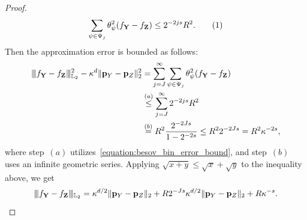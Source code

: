 \documentclass[twoside,11pt]{article}
\newcommand\numberthis{\addtocounter{equation}{1}\tag{\theequation}}
\newcommand{\Ell}{\mathbb{L}}
\newcommand{\EllTwo}{\Ell_2} %
\newcommand{\rvTwo}{Y}
\newcommand{\rvThree}{Z}
\newcommand{\vectorize}[1]{\mathbf{#1}}
\newcommand{\dimDensity}{d} %
\newcommand{\probVec}{\mathbf{p}} %
\newcommand{\smoothness}{s}
\newcommand{\binNum}{\kappa}           %
\newcommand{\wavMotherFunc}{\psi} %
\newcommand{\resLev}{j}
\newcommand{\primResLev}{J}
\newcommand{\wavCoef}{\theta}
\newcommand{\wavGenericMotherCoef}{\wavCoef_{\wavMotherFunc}}
\begin{document}
\begin{appendix}
\begin{proof}
		\begin{align*}
			\sum_{\wavMotherFunc \in {\Psi}_{\resLev}}
			\wavGenericMotherCoef^2(
			f_{\vectorize{Y}}
			-
			f_{\vectorize{Z}}
			)
			\leq
			2^{ -2 \resLev \smoothness}
			R^2.
			\numberthis\label{equation:besov_bin_error_bound}
		\end{align*}
		Then the approximation error is bounded as follows:
		\begin{align*}
			\vert\kern-0.25ex
			\vert\kern-0.25ex
			\vert 
			f_{\vectorize{Y}} - f_{\vectorize{Z}}
			\vert\kern-0.25ex
			\vert\kern-0.25ex
			\vert_{\EllTwo}^2
			-
			\binNum^\dimDensity
			\|\probVec_{\rvTwo} - \probVec_{\rvThree}\|_2^2
			&=
			\sum_{\resLev = \primResLev}^\infty
			\sum_{\psi \in {\Psi}_{\resLev} }
			\wavGenericMotherCoef^2(
			f_{\vectorize{Y}}
			-
			f_{\vectorize{Z}}
			)
			\\ &
			\stackrel{(a)}{\leq}
			\sum_{\resLev = \primResLev}^\infty
			2^{-2\resLev \smoothness} R^2
			\\ &
			\stackrel{(b)}{=}
			R^2 
			\frac{2^{-2 \primResLev \smoothness}
			}{
				1 - 2^{-2\smoothness}
			}
			\leq
			R^2 2^{-2 \primResLev \smoothness}
			=
			R^2 \binNum^{-2\smoothness}
			,
		\end{align*}
		where step~$(a)$ utilizes~\eqref{equation:besov_bin_error_bound},
		and step~$(b)$ uses an infinite geometric series.
		Applying $\sqrt{x+y} \leq \sqrt{x} + \sqrt{y}$ to the inequality above, we get
		\begin{equation*}
			\vert\kern-0.25ex
			\vert\kern-0.25ex
			\vert 
			f_{\vectorize{Y}} - f_{\vectorize{Z}}
			\vert\kern-0.25ex
			\vert\kern-0.25ex
			\vert_{\EllTwo} 
			= 
			\binNum^{\dimDensity/2}
			\|\probVec_{\rvTwo} - \probVec_{\rvThree}\|_2 + R 2^{- \primResLev \smoothness}
			\binNum^{\dimDensity/2}
			\|\probVec_{\rvTwo} - \probVec_{\rvThree}\|_2 + R \binNum^{- \smoothness}.
		\end{equation*}
	\end{proof}

\end{appendix}
\end{document}

